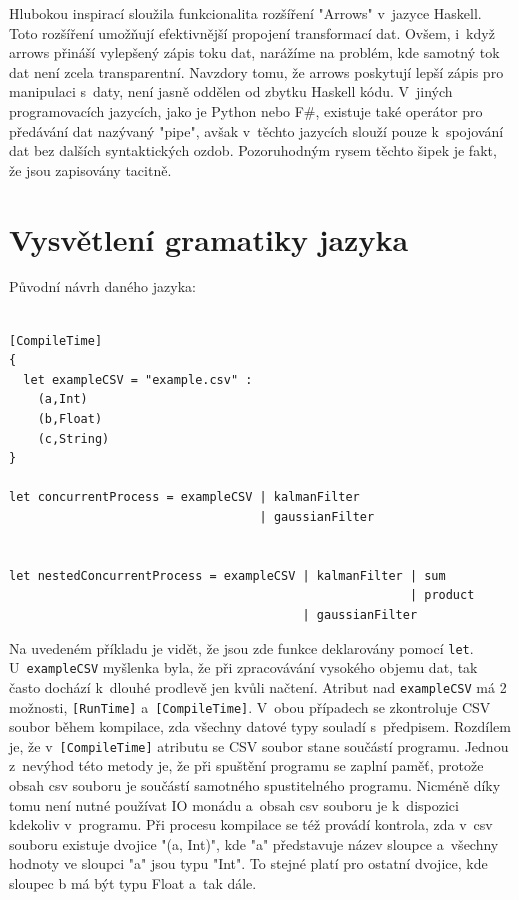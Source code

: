 \documentclass[male, czech]{kithesis}
\newenvironment{code}{\captionsetup{type=listing}}{}
\newcommand{\haskellInline}[1]{\colorbox{gray!10}{\texttt{#1}}}
\begin{document}
Hlubokou inspirací sloužila funkcionalita rozšíření "Arrows" 
v~jazyce Haskell. %
Toto rozšíření umožňují efektivnější propojení transformací dat.
Ovšem,
i~když arrows přináší vylepšený zápis toku dat,
narážíme na problém,
kde samotný tok dat není zcela transparentní.
Navzdory tomu,
že arrows poskytují lepší zápis pro manipulaci s~daty,
není jasně oddělen od zbytku Haskell kódu.
V~jiných programovacích jazycích,
jako je Python nebo F\#,
existuje také operátor pro předávání dat nazývaný "pipe",
avšak v~těchto jazycích slouží pouze k~spojování dat bez dalších syntaktických ozdob.
Pozoruhodným rysem těchto šipek je fakt,
že jsou zapisovány tacitně.

\section{Vysvětlení gramatiky jazyka}


\setlength{\parindent}{0pt}
Původní návrh daného jazyka:

\begin{code}
\begin{verbatim}

[CompileTime]
{
  let exampleCSV = "example.csv" :
    (a,Int)
    (b,Float)
    (c,String)
}

let concurrentProcess = exampleCSV | kalmanFilter 
                                   | gaussianFilter 
                                      

let nestedConcurrentProcess = exampleCSV | kalmanFilter | sum
                                                        | product
                                         | gaussianFilter

\end{verbatim}
\end{code}

Na uvedeném příkladu je vidět,
že jsou zde funkce deklarovány pomocí \haskellInline{let}.
U~\haskellInline{exampleCSV} myšlenka byla, 
že při zpracovávání vysokého objemu dat,
tak často dochází k~dlouhé prodlevě jen kvůli načtení.
Atribut nad \haskellInline{exampleCSV} 
má 2 možnosti, 
\haskellInline{[RunTime]} a~\haskellInline{[CompileTime]}.
V~obou případech se
zkontroluje CSV soubor během kompilace, 
zda všechny datové typy souladí s~předpisem.
Rozdílem je, 
že v~\haskellInline{[CompileTime]} atributu se CSV soubor
stane součástí programu. 
Jednou z~nevýhod této metody je, 
že při spuštění programu se zaplní paměť, 
protože obsah csv souboru je součástí samotného spustitelného programu.
Nicméně díky tomu není nutné používat IO monádu
a~obsah csv souboru je k~dispozici kdekoliv v~programu.
Při procesu kompilace se též provádí kontrola, 
zda v~csv souboru existuje dvojice "(a, Int)", 
kde "a" představuje název sloupce
a~všechny hodnoty ve sloupci "a" jsou typu "Int".
To stejné platí pro ostatní dvojice, 
kde sloupec b má být typu Float a~tak dále.
\end{document}
